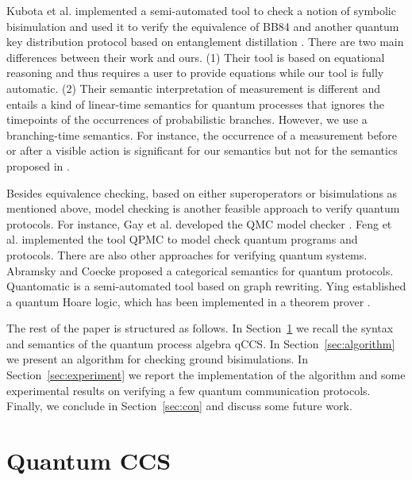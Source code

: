 \documentclass[a4paper,runningheads]{llncs}
\begin{document}
Kubota et al. \cite{KKKKS16}  implemented a semi-automated tool to check a notion of symbolic bisimulation and  used it to verify the equivalence of BB84  and another quantum key distribution protocol based on entanglement distillation \cite{SP00}. There are two main differences between their work and ours. (1) Their tool is based on equational reasoning and thus requires a user to provide equations while our tool is fully automatic. (2) Their semantic interpretation of measurement is different and entails a kind of linear-time semantics for quantum processes that ignores the timepoints of the occurrences of probabilistic branches. However, we use a branching-time semantics. For instance, the occurrence of a measurement before or after a visible action is significant for our semantics but not for the semantics proposed in \cite{KKKKS16}.

Besides equivalence checking, based on either superoperators or bisimulations as mentioned above, model checking is another feasible approach to verify quantum protocols. For instance, Gay et al. developed the QMC model checker \cite{GNP08}.
Feng et al. implemented  the tool QPMC \cite{FHTZ15} to model check quantum programs and protocols. There are also other approaches for verifying quantum systems. Abramsky and Coecke \cite{AC04} proposed a categorical semantics for quantum protocols. Quantomatic \cite{Kis11} is a semi-automated tool based on graph rewriting. Ying \cite{Yin16} established a quantum Hoare logic, which has been implemented in a theorem prover \cite{LLWYZ16}.

The rest of the paper is structured as follows. %
In Section~\ref{sec:qccs} we recall the syntax and semantics of the quantum process algebra qCCS. In Section~\ref{sec:algorithm} we present an algorithm for checking ground bisimulations. In Section~\ref{sec:experiment} we report the implementation of the algorithm and some experimental results on verifying a few quantum communication protocols. Finally, we conclude in Section~\ref{sec:con} and discuss some future work.


\section{Quantum CCS}\label{sec:qccs}
\end{document}

